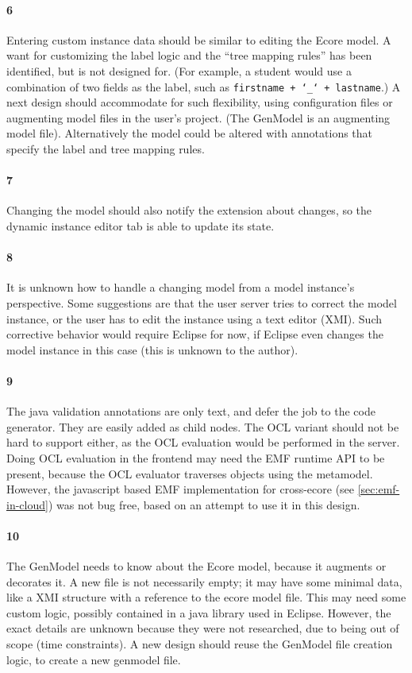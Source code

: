 \paragraph{6} Entering custom instance data should be similar to editing the \gls{Ecore} model.
A want for customizing the label logic and the ``tree mapping rules'' has been identified, but is not designed for.
(For example, a student would use a combination of two fields as the label, such as \texttt{firstname + `\_` + lastname}.)
A next design should accommodate for such flexibility, using configuration files or augmenting model files in the user's project.
(The GenModel is an augmenting model file).
Alternatively the model could be altered with annotations that specify the label and tree mapping rules.

\paragraph{7} Changing the model should also notify the extension about changes, so the dynamic instance editor tab is able to update its state.

\paragraph{8} It is unknown how to handle a changing model from a model instance's perspective.
Some suggestions are that the user server tries to correct the model instance, or the user has to edit the instance using a text editor (\acrshort{XMI}).
Such corrective behavior would require \gls{Eclipse} for now, if \gls{Eclipse} even changes the model instance in this case (this is unknown to the author).

\paragraph{9} The java validation annotations are only text, and defer the job to the code generator.
They are easily added as child nodes.
The \acrshort{OCL} variant should not be hard to support either, as the OCL evaluation would be performed in the server.
Doing OCL evaluation in the frontend may need the \acrshort{EMF} runtime \acrshort{API} to be present, because the OCL evaluator traverses objects using the metamodel.
However, the javascript based \acrshort{EMF} implementation for cross-ecore (see \cref{sec:emf-in-cloud}) was not bug free, based on an attempt to use it in this design.

\paragraph{10} The GenModel needs to know about the \gls{Ecore} model, because it augments or decorates it.
A new file is not necessarily empty; it may have some minimal data, like a \acrshort{XMI} structure with a reference to the ecore model file.
This may need some custom logic, possibly contained in a java library used in \gls{Eclipse}.
However, the exact details are unknown because they were not researched, due to being out of scope (time constraints).
A new design should reuse the GenModel file creation logic, to create a new genmodel file.

